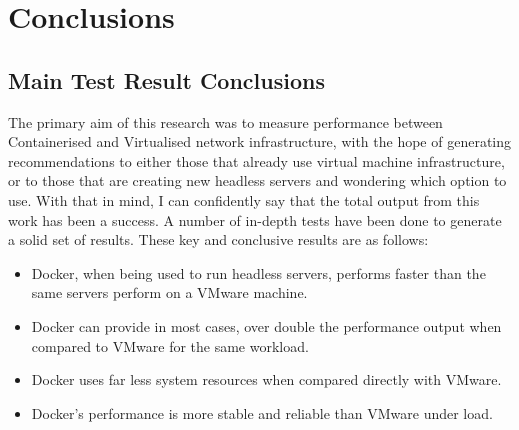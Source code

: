 \chapter{Conclusions}
\section{Main Test Result Conclusions}
The primary aim of this research was to measure performance between Containerised and Virtualised network infrastructure, with the hope of generating recommendations to either those that already use virtual machine infrastructure, or to those that are creating new headless servers and wondering which option to use.
With that in mind, I can confidently say that the total output from this work has been a success. A number of in-depth tests have been done to generate a solid set of results. These key and conclusive results are as follows:
\begin{itemize}
  \item Docker, when being used to run headless servers, performs faster than the same servers perform on a VMware machine.
  \item Docker can provide in most cases, over double the performance output when compared to VMware for the same workload.
  \item Docker uses far less system resources when compared directly with VMware.
  \item Docker's performance is more stable and reliable than VMware under load.
\end{itemize}

